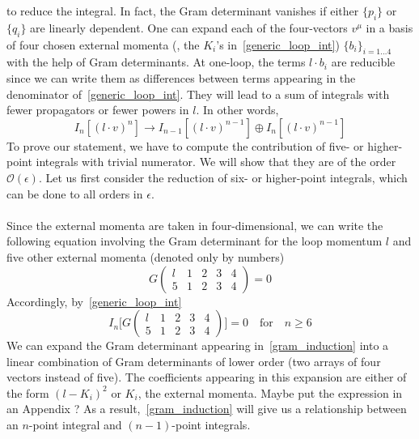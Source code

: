 to reduce the integral.
In fact, the Gram determinant vanishes if either $\{p_i\}$ or $\{q_i\}$ are linearly dependent.
One can expand each of the four-vectors $v^\mu$ in a basis of four chosen external momenta (\ie , the $K_i$'s in~\cref{generic_loop_int}) $\{b_i\}_{i=1\ldots 4}$ with the help of Gram determinants.
At one-loop, the terms $l\cdot b_i$ are reducible since we can write them as differences between terms appearing in the denominator of~\cref{generic_loop_int}.
They will lead to a sum of integrals with fewer propagators or fewer powers in $l$. 
In other words, 
\begin{equation*}
I_n[(l\cdot v)^n] \rightarrow I_{n-1}[(l\cdot v)^{n-1}]\oplus I_n[(l\cdot v)^{n-1}]
\end{equation*}
To prove our statement, we have to compute the contribution of five- or higher-point integrals with trivial numerator. 
We will show that they are of the order $\mathcal{O}(\epsilon)$.
Let us first consider the reduction of six- or higher-point integrals, which can be done to all orders in $\epsilon$. 
\\\\
Since the external momenta are taken in four-dimensional,
we can write the following equation involving the Gram determinant for the loop momentum $l$ and five other external momenta (denoted only by numbers) 
\begin{equation*}
G\begin{pmatrix}
l & 1 & 2 & 3 & 4\\
5 & 1 & 2 & 3 & 4 
\end{pmatrix}
 = 0
\end{equation*}
Accordingly, by~\cref{generic_loop_int}
\begin{equation}\label{gram_induction}
I_n\Big[G\begin{pmatrix}
l & 1 & 2 & 3 & 4\\
5 & 1 & 2 & 3 & 4 
\end{pmatrix}\Big]
 = 0
 \quad\mathrm{for}\quad n\geq 6
\end{equation}
We can expand the Gram determinant appearing in~\cref{gram_induction} into a linear combination of Gram determinants of lower order (two arrays of four vectors instead of five).
The coefficients appearing in this expansion are either of the form $(l-K_i)^2$ or $K_i$, the external momenta.
\color{red} Maybe put the expression in an Appendix ?\color{black}
As a result,~\cref{gram_induction} will give us a relationship between an $n$-point integral and $(n-1)$-point integrals.
\\\\
